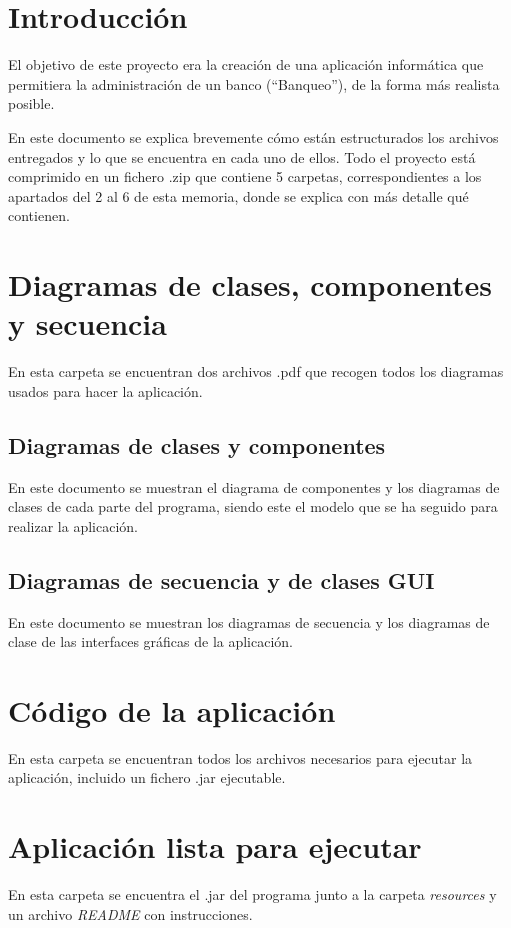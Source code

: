 \documentclass[12pt]{article}
\begin{document}
\section{Introducción}
El objetivo de este proyecto era la creación de una aplicación informática que permitiera la administración de un banco (``Banqueo''), de la forma más realista posible.

En este documento se explica brevemente cómo están estructurados los archivos entregados y lo que se encuentra en cada uno de ellos. Todo el proyecto está comprimido en un fichero .zip que contiene 5 carpetas, correspondientes a los apartados del 2 al 6 de esta memoria, donde se explica con más detalle qué contienen.


\section{Diagramas de clases, componentes y secuencia}

En esta carpeta se encuentran dos archivos .pdf que recogen todos los diagramas usados para hacer la aplicación.
\subsection{Diagramas de clases y componentes}

En este documento se muestran el diagrama de componentes y los diagramas de clases de cada parte del programa, siendo este el modelo que se ha seguido para realizar la aplicación.
\subsection{Diagramas de secuencia y de clases GUI}

En este documento se muestran los diagramas de secuencia y los diagramas de clase de las interfaces gráficas de la aplicación.


\section{Código de la aplicación}
En esta carpeta se encuentran todos los archivos necesarios para ejecutar la aplicación, incluido un fichero .jar ejecutable.

\section{Aplicación lista para ejecutar}
En esta carpeta se encuentra el .jar del programa junto a la carpeta \textit{resources} y un archivo \textit{README} con instrucciones.
\end{document}
